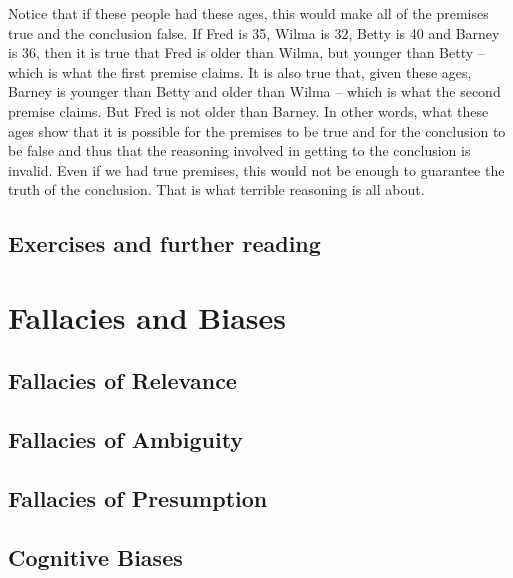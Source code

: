 \documentclass[justified]{tufte-book}
\begin{document}
Notice that if these people had these ages, this would make all of the premises true and the conclusion false. If Fred is 35, Wilma is 32, Betty is 40 and Barney is 36, then it is true that Fred is older than Wilma, but younger than Betty -- which is what the first premise claims. It is also true that, given these ages, Barney is younger than Betty and older than Wilma -- which is what the second premise claims. But Fred is not older than Barney. In other words, what these ages show that it is possible for the premises to be true and for the conclusion to be false and thus that the reasoning involved in getting to the conclusion is invalid. Even if we had true premises, this would not be enough to guarantee the truth of the conclusion. That is what terrible reasoning is all about.

\hypertarget{exercises-and-further-reading}{%
\section*{Exercises and further reading}\label{exercises-and-further-reading}}

\hypertarget{fallacies-and-biases}{%
\chapter{Fallacies and Biases}\label{fallacies-and-biases}}

\hypertarget{fallacies-of-relevance}{%
\section{Fallacies of Relevance}\label{fallacies-of-relevance}}

\hypertarget{fallacies-of-ambiguity}{%
\section{Fallacies of Ambiguity}\label{fallacies-of-ambiguity}}

\hypertarget{fallacies-of-presumption}{%
\section{Fallacies of Presumption}\label{fallacies-of-presumption}}

\hypertarget{cognitive-biases}{%
\section{Cognitive Biases}\label{cognitive-biases}}
\end{document}
